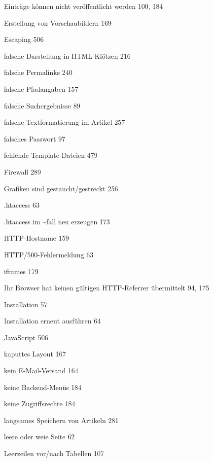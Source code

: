 \documentclass{book}
\renewcommand\subitem{\par}
\begin{document}
\begin{multicols}{2}
\begin{osp-index}
    \subitem Eintr\"age k\"onnen nicht ver\"offentlicht werden\hspace{1mm} 
		100, 184
    \subitem Erstellung von Vorschaubildern\hspace{1mm} 169
    \subitem Escaping\hspace{1mm} 506
    \subitem falsche Darstellung in HTML-Kl\"otzen\hspace{1mm} 216
    \subitem falsche Permalinks\hspace{1mm} 240
    \subitem falsche Pfadangaben\hspace{1mm} 157
    \subitem falsche Suchergebnisse\hspace{1mm} 89
    \subitem falsche Textformatierung im Artikel\hspace{1mm} 257
    \subitem falsches Passwort\hspace{1mm} 97
    \subitem fehlende Template-Dateien\hspace{1mm} 479
    \subitem Firewall\hspace{1mm} 289
    \subitem Grafiken sind gestaucht/gestreckt\hspace{1mm} 256
    \subitem .htaccess\hspace{1mm} 63
    \subitem .htaccess im \textasciitilde{}fall neu erzeugen\hspace{1mm} 
		173
    \subitem HTTP-Hostname\hspace{1mm} 159
    \subitem HTTP/500-Fehlermeldung\hspace{1mm} 63
    \subitem iframes\hspace{1mm} 179
    \subitem Ihr Browser hat keinen g\"ultigen HTTP-Referrer \"ubermittelt\hspace{1mm} 
		94, 175
    \subitem Installation\hspace{1mm} 57
    \subitem Installation erneut ausf\"uhren\hspace{1mm} 64
    \subitem JavaScript\hspace{1mm} 506
    \subitem kaputtes Layout\hspace{1mm} 167
    \subitem kein E-Mail-Versand\hspace{1mm} 164
    \subitem keine Backend-Men\"us\hspace{1mm} 184
    \subitem keine Zugriffsrechte\hspace{1mm} 184
    \subitem langsames Speichern von Artikeln\hspace{1mm} 281
    \subitem leere oder wei\IeC {\ss }e Seite\hspace{1mm} 62
    \subitem Leerzeilen vor/nach Tabellen\hspace{1mm} 107

\end{osp-index}
\end{multicols}
\end{document}
